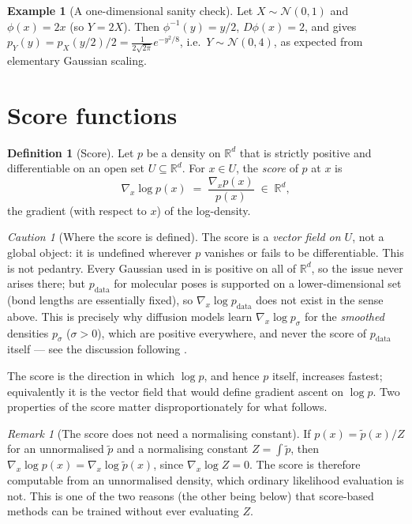 \documentclass[11pt,a4paper]{report}
\theoremstyle{definition}
\newtheorem{definition}[definition]{Definition}
\newtheorem{example}[example]{Example}
\theoremstyle{remark}
\newtheorem{remark}[remark]{Remark}
\newtheorem{caution}[caution]{Caution}
\newcommand{\RR}{\mathbb R}
\begin{document}
\begin{example}[A one-dimensional sanity check]
Let $X\sim\mathcal N(0,1)$ and $\phi(x)=2x$ (so $Y=2X$). Then
$\phi^{-1}(y)=y/2$, $D\phi(x)=2$, and  gives
$p_Y(y) = p_X(y/2)/2 = \tfrac1{2\sqrt{2\pi}}e^{-y^2/8}$, i.e.\ $Y\sim\mathcal N(0,4)$,
as expected from elementary Gaussian scaling.
\end{example}

\section{Score functions}
\label{sec:score-intro}

\begin{definition}[Score]
\label{def:score}
Let $p$ be a density on $\RR^d$ that is strictly positive and differentiable
on an open set $U\subseteq\RR^d$. For $x\in U$, the \emph{score} of $p$ at
$x$ is
\[
\nabla_x \log p(x) \;=\; \frac{\nabla_x p(x)}{p(x)} \;\in\;\RR^d,
\]
the gradient (with respect to $x$) of the log-density.
\end{definition}

\begin{caution}[Where the score is defined]
\label{caution:score-domain}
The score is a \emph{vector field on $U$}, not a global object: it is
undefined wherever $p$ vanishes or fails to be differentiable. This is not
pedantry. Every Gaussian used in  is positive on all of
$\RR^d$, so the issue never arises there; but $p_{\mathrm{data}}$ for
molecular poses is supported on a lower-dimensional set (bond lengths are
essentially fixed), so $\nabla_x\log p_{\mathrm{data}}$ does not exist in the
sense above. This is precisely why diffusion models learn
$\nabla_x\log p_\sigma$ for the \emph{smoothed} densities $p_\sigma$
($\sigma>0$), which are positive everywhere, and never the score of
$p_{\mathrm{data}}$ itself --- see the discussion following
.
\end{caution}

The score is the direction in which $\log p$, and hence $p$ itself,
increases fastest; equivalently it is the vector field that would define
gradient ascent on $\log p$. Two properties of the score matter
disproportionately for what follows.

\begin{remark}[The score does not need a normalising constant]
\label{rem:score-no-const}
If $p(x)=\tilde p(x)/Z$ for an unnormalised $\tilde p$ and a normalising
constant $Z=\int \tilde p$, then $\nabla_x\log p(x)=\nabla_x\log\tilde p(x)$,
since $\nabla_x\log Z = 0$. The score is therefore computable from an
unnormalised density, which ordinary likelihood evaluation is not. This is
one of the two reasons (the other being  below) that
score-based methods can be trained without ever evaluating $Z$.
\end{remark}
\end{document}
